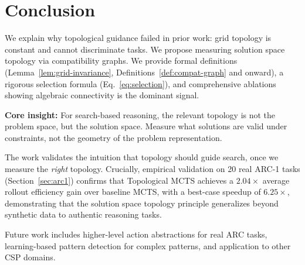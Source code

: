 \documentclass[11pt]{article}
\begin{document}
\section{Conclusion}

We explain why topological guidance failed in prior work: grid topology is constant and cannot discriminate tasks. We propose measuring solution space topology via compatibility graphs. We provide formal definitions (Lemma~\ref{lem:grid-invariance}, Definitions~\ref{def:compat-graph} and onward), a rigorous selection formula (Eq.~\ref{eq:selection}), and comprehensive ablations showing algebraic connectivity is the dominant signal.

\textbf{Core insight:} For search-based reasoning, the relevant topology is not the problem space, but the solution space. Measure what solutions are valid under constraints, not the geometry of the problem representation.

The work validates the intuition that topology should guide search, once we measure the \emph{right} topology. Crucially, empirical validation on 20 real ARC-1 tasks (Section~\ref{sec:arc1}) confirms that Topological MCTS achieves a $2.04\times$ average rollout efficiency gain over baseline MCTS, with a best-case speedup of $6.25\times$, demonstrating that the solution space topology principle generalizes beyond synthetic data to authentic reasoning tasks.

Future work includes higher-level action abstractions for real ARC tasks, learning-based pattern detection for complex patterns, and application to other CSP domains.
\end{document}
